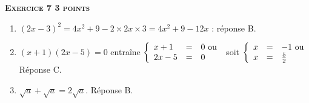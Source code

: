 \textbf{\textsc{Exercice 7 \hfill 3 points}}

\medskip

%
%
%
\begin{enumerate}
\item $(2x - 3)^2 =  4x^2 + 9 - 2 \times 2x \times 3 = 4x^2 + 9 - 12x$ : réponse B.
\item $(x + 1)(2x - 5) = 0$ entraîne $\left\{\begin{array}{l c l}
x + 1&=&0\ \text{ou}\\
2x - 5&=&0
\end{array}\right.$ soit $\left\{\begin{array}{l c l}
x &=&- 1\ \text{ou}\\
x &=&\frac{5}{2}
\end{array}\right.$ Réponse C.
\item $\sqrt{a} + \sqrt{a} = 2\sqrt{a}$. Réponse B.
\end{enumerate}

\vspace{0,5cm}

